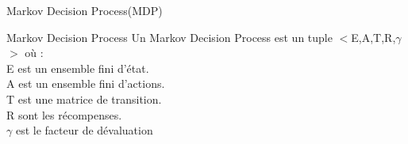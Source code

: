 \begin{frame}{Markov Decision Process(MDP)}{}
	\begin{center}
		\begin{block}{Markov Decision Process}
			Un Markov Decision Process est un tuple $<$E,A,T,R,$\gamma$$>$ où :\\
			E est un ensemble fini d'état.\\
			A est un ensemble fini d'actions.\\
			T est une matrice de transition.\\
			R sont les récompenses.\\
			$\gamma$ est le facteur de dévaluation
		\end{block}
	\end{center}
\end{frame}
